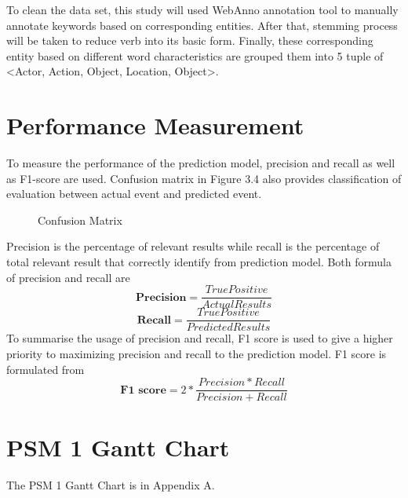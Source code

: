 \documentclass[twoside]{utmthesis}
\begin{document}
\vspace{-1cm}
To clean the data set, this study will used WebAnno annotation tool to manually annotate keywords based on corresponding entities. After that, stemming process will be taken to reduce verb into its basic form. Finally, these corresponding entity based on different word characteristics are grouped them into 5 tuple of <Actor, Action, Object, Location, Object>. 


\section{Performance Measurement}
To measure the performance of the prediction model, precision and recall as well as F1-score are used. Confusion matrix in Figure 3.4 also provides classification of evaluation between actual event and predicted event.

\begin{figure}[H]
	\centering
	\caption{Confusion Matrix}
	\label{fig:confusionmatrix}
\end{figure}
\vspace{-1cm}

Precision is the percentage of relevant results while recall is the percentage of total relevant result that correctly identify from prediction model. Both formula of precision and recall are
\begin{equation}\label{3.3}
\textbf{Precision} = \frac{True Positive}{Actual Results} 
\end{equation}
\begin{equation}\label{3.4}
\textbf{Recall} = \frac{True Positive}{Predicted Results} 
\end{equation}
To summarise the usage of precision and recall, F1 score is used to give a higher priority to maximizing precision and recall to the prediction model. F1 score is formulated from 
\begin{equation}\label{3.5}
\textbf{F1 score} = 2 * \frac{Precision * Recall}{Precision + Recall} 
\end{equation}

\section{PSM 1 Gantt Chart}
The PSM 1 Gantt Chart is in Appendix A. 
\end{document}
